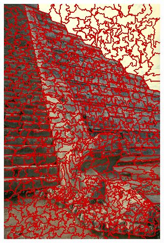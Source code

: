 \begin{figure}
{		\includegraphics[scale=\scalefivebsdtest]{pictures/bsd-test-6-ers}
	}
	\subfigure{
}
\end{figure}
